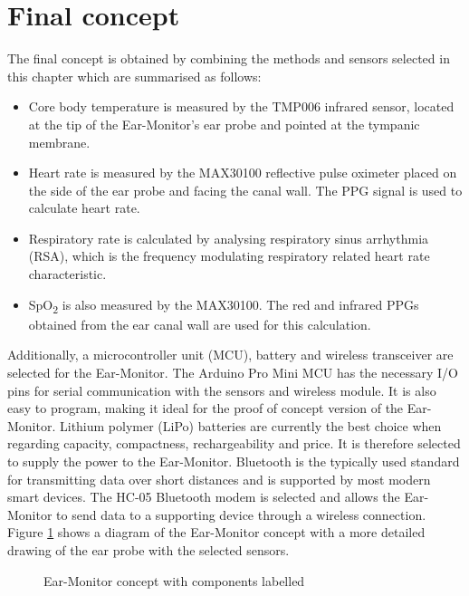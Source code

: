 \section{Final concept}
The final concept is obtained by combining the methods and sensors selected in this chapter which are summarised as follows:

\begin{itemize}
\item Core body temperature is measured by the TMP006 infrared sensor, located at the tip of the Ear-Monitor's ear probe and pointed at the tympanic membrane.
\item Heart rate is measured by the MAX30100 reflective pulse oximeter placed on the side of the ear probe and facing the canal wall. The PPG signal is used to calculate heart rate.
\item Respiratory rate is calculated by analysing respiratory sinus arrhythmia (RSA), which is the frequency modulating respiratory related heart rate characteristic.
\item SpO\textsubscript{2} is also measured by the MAX30100. The red and infrared PPGs obtained from the ear canal wall are used for this calculation.
\end{itemize}

\medskip

Additionally, a microcontroller unit (MCU), battery and wireless transceiver are selected for the Ear-Monitor. The Arduino Pro Mini MCU has the necessary I/O pins for serial communication with the sensors and wireless module. It is also easy to program, making it ideal for the proof of concept version of the Ear-Monitor. Lithium polymer (LiPo) batteries are currently the best choice when regarding capacity, compactness, rechargeability and price. It is therefore selected to supply the power to the Ear-Monitor. Bluetooth is the typically used standard for transmitting data over short distances and is supported by most modern smart devices. The HC-05 Bluetooth modem is selected and allows the Ear-Monitor to send data to a supporting device through a wireless connection. Figure \ref{fig:EarMonitor_Concept} shows a diagram of the Ear-Monitor concept with a more detailed drawing of the ear probe with the selected sensors.

\begin{figure}[H]
\centering
\graphicspath{{figs/}}

\caption{Ear-Monitor concept with components labelled}
\label{fig:EarMonitor_Concept}
\end{figure}


